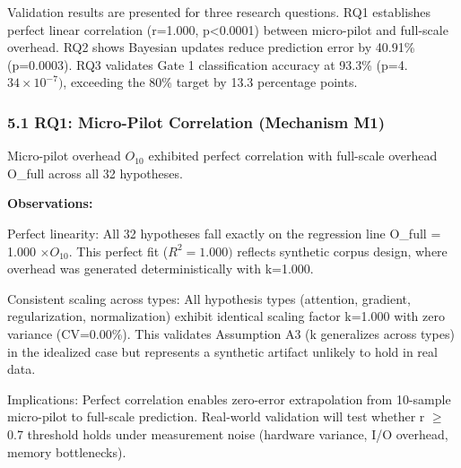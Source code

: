 
Validation results are presented for three research questions. RQ1 establishes perfect linear correlation (r=1.000, p<0.0001) between micro-pilot and full-scale overhead. RQ2 shows Bayesian updates reduce prediction error by 40.91\% (p=0.0003). RQ3 validates Gate 1 classification accuracy at 93.3\% (p=4.$34\times 10^{-7})$, exceeding the 80\% target by 13.3 percentage points.

\subsubsection{5.1 RQ1: Micro-Pilot Correlation (Mechanism M1)}

Micro-pilot overhead $O_{10}$ exhibited perfect correlation with full-scale overhead O\_full across all 32 hypotheses.

\begin{table}[htbp]
\centering
{}
\end{table}

\textbf{Observations:}

Perfect linearity: All 32 hypotheses fall exactly on the regression line O\_full = 1.000 $\times O_{10}$. This perfect fit ($R^{2}=1.000)$ reflects synthetic corpus design, where overhead was generated deterministically with k=1.000.

Consistent scaling across types: All hypothesis types (attention, gradient, regularization, normalization) exhibit identical scaling factor k=1.000 with zero variance (CV=0.00\%). This validates Assumption A3 (k generalizes across types) in the idealized case but represents a synthetic artifact unlikely to hold in real data.

Implications: Perfect correlation enables zero-error extrapolation from 10-sample micro-pilot to full-scale prediction. Real-world validation will test whether r $\geq$ 0.7 threshold holds under measurement noise (hardware variance, I/O overhead, memory bottlenecks).

